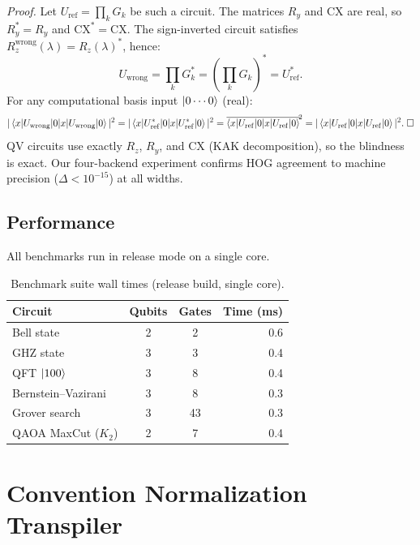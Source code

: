 \documentclass[11pt,a4paper]{article}
\begin{document}
\textit{Proof.} Let $U_{\mathrm{ref}} = \prod_k G_k$ be such a circuit. The
matrices $R_y$ and $\mathrm{CX}$ are real, so $R_y^* = R_y$ and
$\mathrm{CX}^* = \mathrm{CX}$. The sign-inverted circuit satisfies
$R_z^{\mathrm{wrong}}(\lambda) = R_z(\lambda)^*$, hence:
\begin{equation}
  U_{\mathrm{wrong}} = \prod_k G_k^* = \left(\prod_k G_k\right)^* = U_{\mathrm{ref}}^*.
\end{equation}
For any computational basis input $\ket{0\cdots0}$ (real):
\begin{equation}
  |\braket{x|U_{\mathrm{wrong}}|0}|^2 = |\braket{x|U_{\mathrm{ref}}^*|0}|^2 =
  \overline{\braket{x|U_{\mathrm{ref}}|0}}^{\!2} = |\braket{x|U_{\mathrm{ref}}|0}|^2. \;\square
\end{equation}
QV circuits use exactly $R_z$, $R_y$, and $\mathrm{CX}$ (KAK decomposition),
so the blindness is exact. Our four-backend experiment confirms
HOG agreement to machine precision ($\Delta < 10^{-15}$) at all widths.

\subsection{Performance}

All benchmarks run in release mode on a single core.

\begin{table}[h!]
\centering
\caption{Benchmark suite wall times (release build, single core).}
\label{tab:timing}
\begin{tabular}{lccr}
\toprule
Circuit & Qubits & Gates & Time (ms) \\
\midrule
Bell state                & 2 & 2  & 0.6 \\
GHZ state                 & 3 & 3  & 0.4 \\
QFT $\ket{100}$           & 3 & 8  & 0.4 \\
Bernstein--Vazirani       & 3 & 8  & 0.3 \\
Grover search             & 3 & 43 & 0.3 \\
QAOA MaxCut ($K_2$)       & 2 & 7  & 0.4 \\
\bottomrule
\end{tabular}
\end{table}

\section{Convention Normalization Transpiler}
\end{document}
